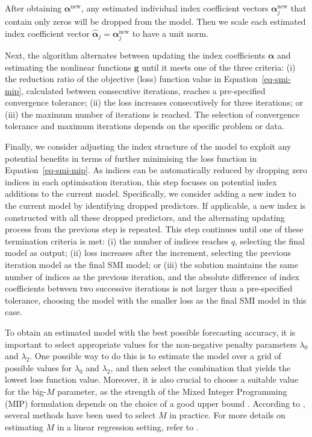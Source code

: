 \documentclass[
  11pt,
  a4paper,
]{article}
\begin{document}
After obtaining \(\bm{\alpha}^{\text{new}}\), any estimated individual
index coefficient vectors \(\bm{\alpha}_{j}^{\text{new}}\) that contain
only zeros will be dropped from the model. Then we scale each estimated
index coefficient vector
\(\hat{\bm{\alpha}}_{j} = \bm{\alpha}_{j}^{\text{new}}\) to have a unit
norm.

Next, the algorithm alternates between updating the index coefficients
\(\bm{\alpha}\) and estimating the nonlinear functions \(\bm{g}\) until
it meets one of the three criteria: (i) the reduction ratio of the
objective (loss) function value in Equation~\ref{eq-smi-mip}, calculated
between consecutive iterations, reaches a pre-specified convergence
tolerance; (ii) the loss increases consecutively for three iterations;
or (iii) the maximum number of iterations is reached. The selection of
convergence tolerance and maximum iterations depends on the specific
problem or data.

Finally, we consider adjusting the index structure of the model to
exploit any potential benefits in terms of further minimising the loss
function in Equation~\ref{eq-smi-mip}. As indices can be automatically
reduced by dropping zero indices in each optimisation iteration, this
step focuses on potential index additions to the current model.
Specifically, we consider adding a new index to the current model by
identifying dropped predictors. If applicable, a new index is
constructed with all these dropped predictors, and the alternating
updating process from the previous step is repeated. This step continues
until one of these termination criteria is met: (i) the number of
indices reaches \(q\), selecting the final model as output; (ii) loss
increases after the increment, selecting the previous iteration model as
the final SMI model; or (iii) the solution maintains the same number of
indices as the previous iteration, and the absolute difference of index
coefficients between two successive iterations is not larger than a
pre-specified tolerance, choosing the model with the smaller loss as the
final SMI model in this case.

To obtain an estimated model with the best possible forecasting
accuracy, it is important to select appropriate values for the
non-negative penalty parameters \(\lambda_{0}\) and \(\lambda_{2}\). One
possible way to do this is to estimate the model over a grid of possible
values for \(\lambda_{0}\) and \(\lambda_{2}\), and then select the
combination that yields the lowest loss function value. Moreover, it is
also crucial to choose a suitable value for the big-\(M\) parameter, as
the strength of the Mixed Integer Programming (MIP) formulation depends
on the choice of a good upper bound \autocite{Bertsimas2016}. According
to \textcite{Hazimeh2023}, several methods have been used to select
\(M\) in practice. For more details on estimating \(M\) in a linear
regression setting, refer to \textcite{Bertsimas2016}.
\end{document}
